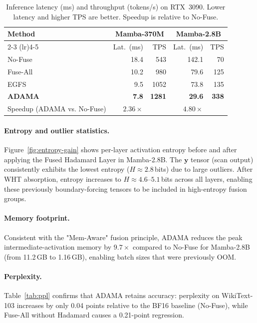 \documentclass{article}
\newcommand{\vy}{\mathbf{y}}          %
\begin{document}
\begin{table}[t]
  \centering
  \caption{Inference latency (ms) and throughput (tokens/s) on RTX~3090.
           Lower latency and higher TPS are better.  Speedup is relative to
           No-Fuse.}
  \label{tab:latency}
  \begin{tabular}{lrrrr}
    \toprule
    \multirow{2}{*}{\textbf{Method}} &
      \multicolumn{2}{c}{\textbf{Mamba-370M}} &
      \multicolumn{2}{c}{\textbf{Mamba-2.8B}} \\
    \cmidrule(lr){2-3} \cmidrule(lr){4-5}
    & Lat.\ (ms) & TPS & Lat.\ (ms) & TPS \\
    \midrule
    No-Fuse  & 18.4 &  543 & 142.1 &  70 \\
    Fuse-All & 10.2 &  980 &  79.6 & 125 \\
    EGFS     &  9.5 & 1052 &  73.8 & 135 \\
    \textbf{ADAMA}  & \textbf{7.8} & \textbf{1281} & \textbf{29.6} & \textbf{338} \\
    \midrule
    Speedup (ADAMA vs. No-Fuse) & $2.36\times$ & & $4.80\times$ & \\
    \bottomrule
  \end{tabular}
\end{table}

\paragraph{Entropy and outlier statistics.}
Figure~\ref{fig:entropy-gain} shows per-layer activation entropy before and
after applying the Fused Hadamard Layer in Mamba-2.8B.  The $\vy$ tensor
(scan output) consistently exhibits the lowest entropy ($H \approx 2.8$\,bits)
due to large outliers.  After WHT absorption, entropy increases to
$H \approx 4.6$--$5.1$\,bits across all layers, enabling these previously
boundary-forcing tensors to be included in high-entropy fusion groups.

\paragraph{Memory footprint.}
Consistent with the "Mem-Aware" fusion principle, ADAMA reduces the peak
intermediate-activation memory by $9.7\times$ compared to No-Fuse for
Mamba-2.8B (from 11.2\,GB to 1.16\,GB), enabling batch sizes that were
previously OOM.

\paragraph{Perplexity.}
Table~\ref{tab:ppl} confirms that ADAMA retains accuracy: perplexity on
WikiText-103 increases by only 0.04 points relative to the BF16 baseline
(No-Fuse), while Fuse-All without Hadamard causes a 0.21-point regression.
\end{document}

